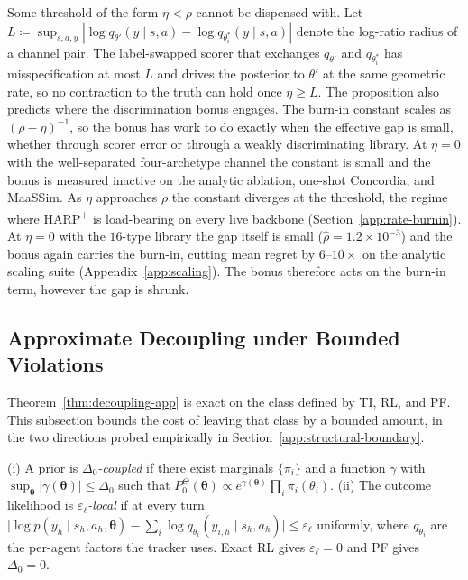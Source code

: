 \begin{remark}
\label{rem:misspec-necessary}
Some threshold of the form $\eta<\rho$ cannot be dispensed with. Let $L\coloneqq\sup_{s,a,y}|\log q_{\theta'}(y\mid s,a)-\log q_{\theta_i^*}(y\mid s,a)|$ denote the log-ratio radius of a channel pair. The label-swapped scorer that exchanges $q_{\theta'}$ and $q_{\theta_i^*}$ has misspecification at most $L$ and drives the posterior to $\theta'$ at the same geometric rate, so no contraction to the truth can hold once $\eta\ge L$. The proposition also predicts where the discrimination bonus engages. The burn-in constant scales as $(\rho-\eta)^{-1}$, so the bonus has work to do exactly when the effective gap is small, whether through scorer error or through a weakly discriminating library. At $\eta=0$ with the well-separated four-archetype channel the constant is small and the bonus is measured inactive on the analytic ablation, one-shot Concordia, and MaaSSim. As $\eta$ approaches $\rho$ the constant diverges at the threshold, the regime where HARP\textsuperscript{+} is load-bearing on every live backbone (Section~\ref{app:rate-burnin}). At $\eta=0$ with the $16$-type library the gap itself is small ($\hat\rho=1.2\times10^{-3}$) and the bonus again carries the burn-in, cutting mean regret by $6$--$10\times$ on the analytic scaling suite (Appendix~\ref{app:scaling}). The bonus therefore acts on the burn-in term, however the gap is shrunk.
\end{remark}

\subsection{Approximate Decoupling under Bounded Violations}
\label{app:approx-decoupling}

Theorem~\ref{thm:decoupling-app} is exact on the class defined by TI, RL, and PF. This subsection bounds the cost of leaving that class by a bounded amount, in the two directions probed empirically in Section~\ref{app:structural-boundary}.

\begin{definition}
\label{def:bounded-violations}
(i) A prior is \emph{$\Delta_0$-coupled} if there exist marginals $\{\pi_i\}$ and a function $\gamma$ with $\sup_{\boldsymbol\theta}|\gamma(\boldsymbol\theta)|\le\Delta_0$ such that $P_0^\Theta(\boldsymbol\theta)\propto e^{\gamma(\boldsymbol\theta)}\prod_i\pi_i(\theta_i)$. (ii) The outcome likelihood is \emph{$\varepsilon_\ell$-local} if at every turn $\big|\log p(y_h\mid s_h,a_h,\boldsymbol\theta)-\sum_i\log q_{\theta_i}(y_{i,h}\mid s_h,a_h)\big|\le\varepsilon_\ell$ uniformly, where $q_{\theta_i}$ are the per-agent factors the tracker uses. Exact RL gives $\varepsilon_\ell=0$ and PF gives $\Delta_0=0$.
\end{definition}

